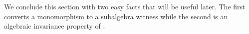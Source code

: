 We conclude this section with two easy facts that will be useful later. The first converts a monomorphism
to a subalgebra witness while the second is an algebraic invariance property of .

\begin{code}%
\>[0]\<%
\\
\>[0]%
\>[11]\AgdaSymbol{:}%
\>[14]\AgdaSymbol{\{}\AgdaSpace{}%
\AgdaSymbol{:}\AgdaSpace{}%
\AgdaSpace{}%
\AgdaSpace{}%
\AgdaSymbol{\}\{}\AgdaSpace{}%
\AgdaSymbol{:}\AgdaSpace{}%
\AgdaSpace{}%
\AgdaSpace{}%
\AgdaSymbol{\}}\AgdaSpace{}%
\AgdaSpace{}%
\AgdaSpace{}%
\AgdaSpace{}%
\AgdaSpace{}%
\AgdaSpace{}%
\AgdaSpace{}%
\AgdaSpace{}%
\<%
\\
\>[0]\AgdaSpace{}%
\AgdaSymbol{\{}\AgdaSpace{}%
\AgdaSymbol{=}\AgdaSpace{}%
\AgdaSymbol{\}\{}\AgdaSymbol{\}}\AgdaSpace{}%
\AgdaSpace{}%
\AgdaSymbol{=}\AgdaSpace{}%
\AgdaSpace{}%
\AgdaSpace{}%
\AgdaSpace{}%
\<%
\\
%
\\[\AgdaEmptyExtraSkip]%
\>[0]%
\>[11]\AgdaSymbol{:}%
\>[14]\AgdaSymbol{\{}\AgdaSpace{}%
\AgdaSymbol{:}\AgdaSpace{}%
\AgdaSpace{}%
\AgdaSpace{}%
\AgdaSymbol{\}\{}\AgdaSpace{}%
\AgdaSymbol{:}\AgdaSpace{}%
\AgdaSpace{}%
\AgdaSpace{}%
\AgdaSymbol{\}\{}\AgdaSpace{}%
\AgdaSymbol{:}\AgdaSpace{}%
\AgdaSpace{}%
\AgdaSpace{}%
\AgdaSymbol{\}}\<%
\\
\>[0][@{}l@{\AgdaIndent{0}}]%
\>[1]%
\>[14]\AgdaSpace{}%
\AgdaSpace{}%
\AgdaSpace{}%
\AgdaSpace{}%
\AgdaSpace{}%
\AgdaSpace{}%
\AgdaSpace{}%
\AgdaSpace{}%
\AgdaSpace{}%
\AgdaSpace{}%
\<%
\\
\>[0]\AgdaSpace{}%
\AgdaSpace{}%

\end{code}
